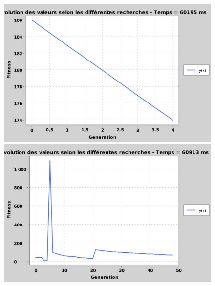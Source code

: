 	\begin{figure}[H]
	\centering
		\begin{minipage}{.5\textwidth}
		  \centering
		  \includegraphics[width=1\linewidth]{images/c16 - LRA with ignore.jpg}
		\end{minipage}%
		\begin{minipage}{.5\textwidth}
		  \centering
		  \includegraphics[width=1\linewidth]{images/c16 - LRA without ignore.jpg}
		\end{minipage}
	\end{figure}

